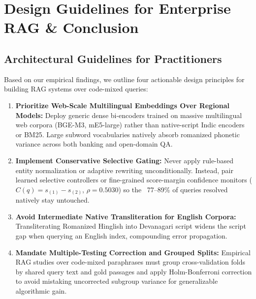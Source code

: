 \documentclass[conference]{IEEEtran}
\begin{document}
\section{Design Guidelines for Enterprise RAG \& Conclusion}
\label{sec:conclusion}

\subsection{Architectural Guidelines for Practitioners}
Based on our empirical findings, we outline four actionable design principles for building RAG systems over code-mixed queries:
\begin{enumerate}
    \item \textbf{Prioritize Web-Scale Multilingual Embeddings Over Regional Models:} Deploy generic dense bi-encoders trained on massive multilingual web corpora (BGE-M3, mE5-large) rather than native-script Indic encoders or BM25. Large subword vocabularies natively absorb romanized phonetic variance across both banking and open-domain QA.
    \item \textbf{Implement Conservative Selective Gating:} Never apply rule-based entity normalization or adaptive rewriting unconditionally. Instead, pair learned selective controllers or fine-grained score-margin confidence monitors ($C(q) = s_{(1)} - s_{(2)}$, $\rho = 0.5030$) so the ~77--89\% of queries resolved natively stay untouched.
    \item \textbf{Avoid Intermediate Native Transliteration for English Corpora:} Transliterating Romanized Hinglish into Devanagari script widens the script gap when querying an English index, compounding error propagation.
    \item \textbf{Mandate Multiple-Testing Correction and Grouped Splits:} Empirical RAG studies over code-mixed paraphrases must group cross-validation folds by shared query text and gold passages and apply Holm-Bonferroni correction to avoid mistaking uncorrected subgroup variance for generalizable algorithmic gain.
\end{enumerate}
\end{document}
